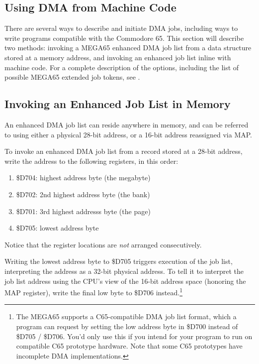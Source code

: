 \subsection{Using DMA from Machine Code}

There are several ways to describe and initiate DMA jobs, including ways to
write programs compatible with the Commodore 65. This section will describe two
methods: invoking a MEGA65 enhanced DMA job list from a data structure
stored at a memory address, and invoking an enhanced job list inline with
machine code. For a complete description of the options, including the list of
possible MEGA65 extended job tokens, see .

\subsection{Invoking an Enhanced Job List in Memory}

An enhanced DMA job list can reside anywhere in memory, and can be referred to
using either a physical 28-bit address, or a 16-bit address reassigned via
MAP.

To invoke an enhanced DMA job list from a record stored at a 28-bit address,
write the address to the following registers, in this order:

\begin{enumerate}
\item \$D704: highest address byte (the megabyte)
\item \$D702: 2nd highest address byte (the bank)
\item \$D701: 3rd highest addresss byte (the page)
\item \$D705: lowest address byte
\end{enumerate}

Notice that the register locations are \emph{not} arranged consecutively.

Writing the lowest address byte to \$D705 triggers execution of the job list,
interpreting the address as a 32-bit physical address. To tell it to interpret
the job list address using the CPU's view of the 16-bit address space
(honoring the MAP register), write the final low byte to \$D706
instead.\footnote{The MEGA65 supports a C65-compatible DMA job list format,
which a program can request by setting the low address byte in \$D700 instead
of \$D705 / \$D706. You'd only use this if you intend for your program to run
on compatible C65 prototype hardware. Note that some C65 prototypes have
incomplete DMA implementations.}

